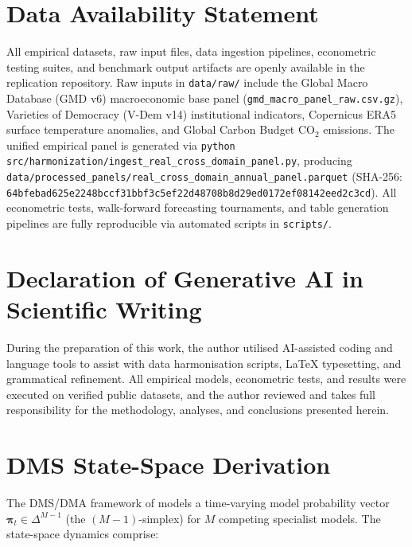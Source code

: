 \documentclass[11pt,a4paper]{article}
\begin{document}
\section*{Data Availability Statement}

All empirical datasets, raw input files, data ingestion pipelines, econometric testing suites, and benchmark output artifacts are openly available in the replication repository. Raw inputs in \texttt{data/raw/} include the Global Macro Database (GMD v6) macroeconomic base panel (\texttt{gmd\_macro\_panel\_raw.csv.gz}), Varieties of Democracy (V-Dem v14) institutional indicators, Copernicus ERA5 surface temperature anomalies, and Global Carbon Budget $\text{CO}_2$ emissions. The unified empirical panel is generated via \texttt{python src/harmonization/ingest\_real\_cross\_domain\_panel.py}, producing \texttt{data/processed\_panels/real\_cross\_domain\_annual\_panel.parquet} (SHA-256: \texttt{64bfebad625e2248bccf31bbf3c5ef22d48708b8d29ed0172ef08142eed2c3cd}). All econometric tests, walk-forward forecasting tournaments, and table generation pipelines are fully reproducible via automated scripts in \texttt{scripts/}.



\section*{Declaration of Generative AI in Scientific Writing}

During the preparation of this work, the author utilised AI-assisted coding and language tools to assist with data harmonisation scripts, \LaTeX{} typesetting, and grammatical refinement. All empirical models, econometric tests, and results were executed on verified public datasets, and the author reviewed and takes full responsibility for the methodology, analyses, and conclusions presented herein.




\newpage
\appendix

\section{DMS State-Space Derivation}
\label{app:dms}

The DMS/DMA framework of \citet{koop2012} models a time-varying model probability vector $\boldsymbol{\pi}_t \in \Delta^{M-1}$ (the $(M{-}1)$-simplex) for $M$ competing specialist models. The state-space dynamics comprise:
\end{document}
